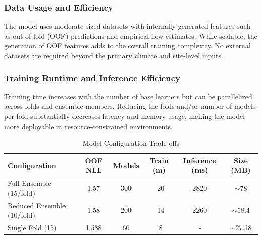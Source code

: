 \documentclass[ruler]{CUP-JNL-EDS}%
\begin{document}
\subsubsection*{Data Usage and Efficiency}
The model uses moderate-sized datasets with internally generated features such as out-of-fold (OOF) predictions and empirical flow estimates. While scalable, the generation of OOF features adds to the overall training complexity. No external datasets are required beyond the primary climate and site-level inputs.

\subsubsection*{Training Runtime and Inference Efficiency}
Training time increases with the number of base learners but can be parallelized across folds and ensemble members. Reducing the folds and/or number of models per fold substantially decreases latency and memory usage, making the model more deployable in resource-constrained environments.

\begin{table}[H]
\centering
\caption{Model Configuration Trade-offs}
\begin{tabular}{lccccc}
\hline
\textbf{Configuration} & \textbf{OOF NLL} & \textbf{Models} & \textbf{Train (m)} & \textbf{Inference (ms)} & \textbf{Size (MB)} \\
\hline
Full Ensemble (15/fold) & 1.57 & 300 & ~20 & 2820 & $\sim$78 \\
Reduced Ensemble (10/fold) & 1.58 & 200 & ~14 & 2260 & $\sim$58.4 \\
Single Fold (15) & 1.588 & 60 & ~8 & - & $\sim$27.18 \\

\hline
\end{tabular}
\label{tab:frugality}
\end{table}
\end{document}
